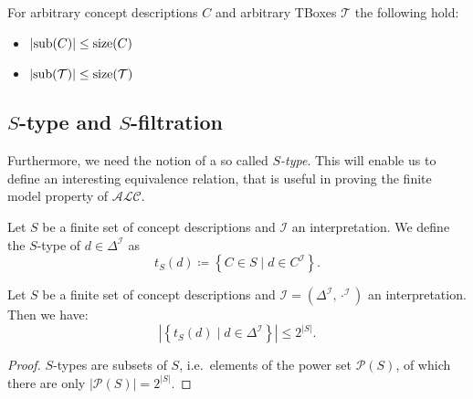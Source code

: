 
\begin{lemma} \label{lem:card(sub)<=size}
	For arbitrary concept descriptions $C$ and arbitrary TBoxes $ \mathcal{T}$ the following hold:
	\begin{itemize}
		\item $\left| \operatorname{\text{sub}}(C) \right| \leq \operatorname{\text{size}}(C)$ 
		\item $\left| \operatorname{\text{sub}}(\mathcal{T}) \right| \leq \operatorname{\text{size}}(\mathcal{T})$
	\end{itemize}
\end{lemma}

\subsection{$S$-type and $S$-filtration}
Furthermore, we need the notion of a so called \textit{$S$-type}.
This will enable us to define an interesting equivalence relation, that is useful in proving the finite model property of $\mathcal{ALC}$.
\begin{definition}[$S$-type]
	Let $S$ be a finite set of concept descriptions and $\mathcal{I}$ an interpretation.
	We define the $S$-type of $d \in \Delta^{\mathcal{I}}$ as
	\[
		t_S(d) \coloneqq \left\{ C \in S \mid d \in C^{\mathcal{I}} \right\}
	.\]
\end{definition}

\begin{lemma}\label{lem:number of s-types}
	Let $S$ be a finite set of concept descriptions and $\mathcal{I} = (\Delta^{\mathcal{I}}, \cdot^{\mathcal{I}})$ an interpretation.
	Then we have:
	 \[
		 \left| \left\{ t_S(d) \mid d \in \Delta^{\mathcal{I}} \right\} \right| \leq 2^{\left| S \right|}
	.\]
\end{lemma}
\begin{proof}
	$S$-types are subsets of $S$, i.e.\ elements of the power set $\mathscr{P}(S)$,
	of which there are only $\lvert \mathscr{P}(S) \rvert = 2^{\lvert S \rvert}$.
\end{proof}

